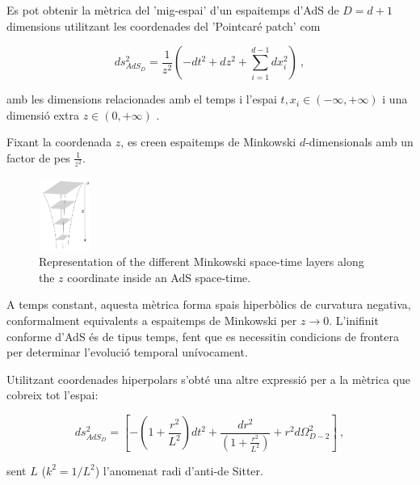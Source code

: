 \documentclass[lettersize,journal]{IEEEtran}
\providecommand{\eq}[2]{
    \begin{equation}
        #2
    \label{eq:#1}
    \end{equation}
}
\begin{document}
Es pot obtenir la mètrica del 'mig-espai' d'un espaitemps d'AdS de $D=d+1$ dimensions utilitzant les coordenades del 'Pointcaré patch' com
\eq{AdS_PP-metric}{
    ds_{AdS_D}^2 = \frac{1}{z^2} \left( -dt^2 + dz^2 + \sum_{i=1}^{d-1} dx_i^2 \right) \ ,
}
amb les dimensions relacionades amb el temps i l'espai $t , x_i \in (-\infty,+\infty)$ i una dimensió extra $z \in (0,+\infty)$ \cite{kaplan_lectures_nodate}.

Fixant la coordenada $z$, es creen espaitemps de Minkowski $d$-dimensionals amb un factor de pes $\frac{1}{z^2}$.

\begin{figure}
    \centering
    \includegraphics[width=0.15\textwidth]{../../Imatges/Captura_Superficies_z.png}
\caption{Representation of the different Minkowski space-time layers along the $z$ coordinate inside an AdS space-time.}
\label{fig:AdS_z-surfaces}
\end{figure}

A temps constant, \cite{} aquesta mètrica forma spais hiperbòlics de curvatura negativa, conformalment equivalents a espaitemps de Minkowski per $z \to 0$. L'inifinit conforme d'AdS és de tipus temps, fent que es necessitin condicions de frontera per determinar l'evolució temporal unívocament.

Utilitzant coordenades hiperpolars s'obté una altre expressió per a la mètrica que cobreix tot l'espai:
\eq{AdS_hyper-polar-metric}{
    ds_{AdS_D}^2 = \left [ - \left ( 1 + \frac{r^2}{L^2} \right ) dt^2 + \frac{dr^2}{\left ( 1+ \frac{r^2}{L^2} \right )} + r^2 d \Omega_{D-2}^2 \right ] \ ,
}
sent $L$ ($k^2=1/L^2$) l'anomenat radi d'anti-de Sitter.
\end{document}
